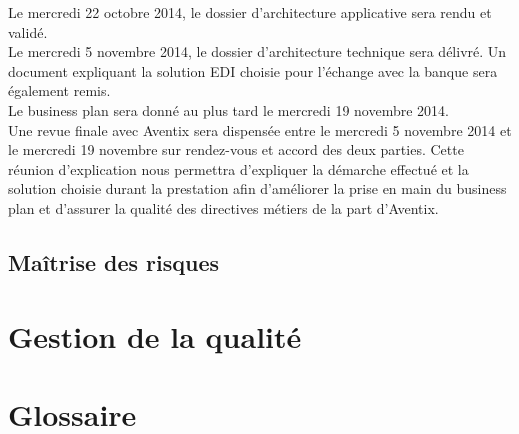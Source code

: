 \documentclass[11pt, a4paper]{article}
\begin{document}
Le mercredi 22 octobre 2014, le dossier d'architecture applicative sera rendu
et validé. \\

Le mercredi 5 novembre 2014, le dossier d'architecture technique sera délivré.
Un document expliquant la solution EDI choisie pour l'échange avec la banque
sera également remis. \\

Le business plan sera donné au plus tard le mercredi 19 novembre 2014. \\

Une revue finale avec Aventix sera dispensée entre le mercredi 5 novembre 2014
et le mercredi 19 novembre sur rendez-vous et accord des deux parties.
Cette réunion d'explication nous permettra d'expliquer la démarche effectué et
la solution choisie durant la prestation afin d'améliorer la prise en main du
business plan et d'assurer la qualité des directives métiers de la part
d'Aventix. \\

\subsection{Maîtrise des risques}

\section{Gestion de la qualité}

\section{Glossaire}
\end{document}
